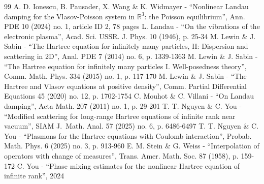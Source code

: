 \documentclass[10pt,a4paper]{article}
\theoremstyle{plain}
\theoremstyle{remark}
\begin{document}
\begin{thebibliography}{99}
 A. D. Ionescu, B. Pausader, X. Wang \& K. Widmayer - “Nonlinear Landau damping for the Vlasov-Poisson system in $\mathbb{R}^3$: the Poisson equilibrium”, Ann. PDE 10 (2024) no. 1, article ID 2, 78 pages
 L. Landau - “On the vibrations of the electronic plasma”, Acad. Sci. USSR. J. Phys. 10 (1946), p. 25-34
 M. Lewin \& J. Sabin - “The Hartree equation for infinitely many particles, II: Dispersion and scattering in 2D”, Anal. PDE 7 (2014) no. 6, p. 1339-1363
 M. Lewin \& J. Sabin - “The Hartree equation for infinitely many particles I. Well-posedness theory”, Comm. Math. Phys. 334 (2015) no. 1, p. 117-170
 M. Lewin \& J. Sabin - “The Hartree and Vlasov equations at positive density”, Comm. Partial Differential Equations 45 (2020) no. 12, p. 1702-1754
 C. Mouhot \& C. Villani - “On Landau damping”, Acta Math. 207 (2011) no. 1, p. 29-201
 T. T. Nguyen \& C. You - “Modified scattering for long-range Hartree equations of infinite rank near vacuum”, SIAM J. Math. Anal. 57 (2025) no. 6, p. 6486-6497
 T. T. Nguyen \& C. You - “Plasmons for the Hartree equations with Coulomb interaction”, Probab. Math. Phys. 6 (2025) no. 3, p. 913-960
 E. M. Stein \& G. Weiss - “Interpolation of operators with change of measures”, Trans. Amer. Math. Soc. 87 (1958), p. 159-172
 C. You - “Phase mixing estimates for the nonlinear Hartree equation of infinite rank”, 2024
\end{thebibliography}
\end{document}
